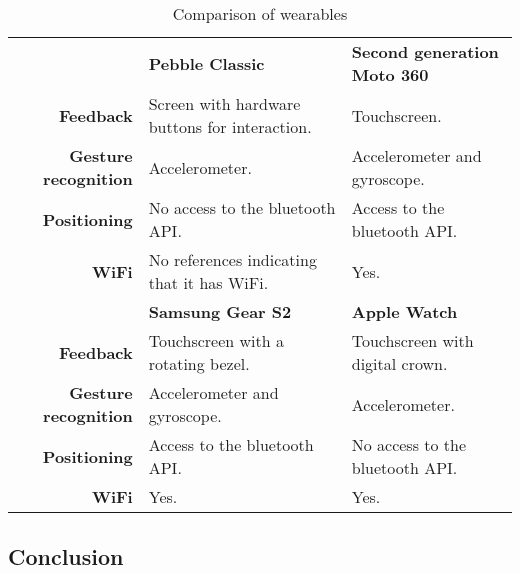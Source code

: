\renewcommand{\arraystretch}{1.2}
\begin{table}[htb]
\centering
\caption{Comparison of wearables}
\label{tbl:analysis:choice-of-wearable}
\begin{tabularx}{\linewidth}{rXX}
\multicolumn{1}{l}{\textbf{}}     & \textbf{Pebble Classic}                       & \textbf{Second generation Moto 360} \\
\textbf{Feedback} & Screen with hardware buttons for interaction. & Touchscreen.                        \\
\textbf{Gesture recognition}      & Accelerometer. \cite{pebble:accelerometer}                                & Accelerometer and gyroscope. \cite{motorola:moto360, android:creating-wearable-apps, android:motion-sensors}        \\
\textbf{Positioning}              & No access to the bluetooth API.               & Access to the bluetooth API. \cite{motorola:moto360, android:creating-wearable-apps, android:bluetooth}        \\
\textbf{WiFi}                     & No references indicating that it has WiFi.    & Yes.                                \\
\multicolumn{1}{l}{}              & \textbf{Samsung Gear S2}                      & \textbf{Apple Watch}                \\
\textbf{Feedback} & Touchscreen with a rotating bezel.             & Touchscreen with digital crown.     \\
\textbf{Gesture recognition}      & Accelerometer and gyroscope. \cite{samsung:gears2, tizen:sensors}                  & Accelerometer.                      \\
\textbf{Positioning}              & Access to the bluetooth API. \cite{samsung:gears2, tizen:bluetooth}                  & No access to the bluetooth API.     \\
\textbf{WiFi}                     & Yes.                                          & Yes.                               
\end{tabularx}
\end{table}

\subsection{Conclusion}


